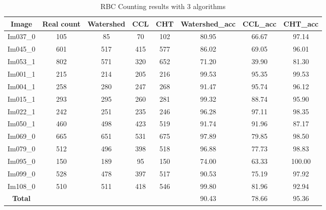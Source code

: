 \begin{table}[H]
\centering
\begin{tabular}{|  c | c | c | c | c | c | c | c |}
\hline
\textbf{Image} & \textbf{Real count} & \textbf{Watershed} & \textbf{CCL} & \textbf{CHT} & \textbf{Watershed\_acc} & \textbf{CCL\_acc} & \textbf{CHT\_acc} \\
\hline
Im037\_0 & 105 & 85 & 70 & 102 & 80.95 & 66.67 & 97.14 \\
Im045\_0 & 601 & 517 & 415 & 577 & 86.02 & 69.05 & 96.01 \\
Im053\_1 & 802 & 571 & 320 & 652 & 71.20 & 39.90 & 81.30 \\
Im001\_1 & 215 & 214 & 205 & 216 & 99.53 & 95.35 & 99.53 \\
Im004\_1 & 258 & 280 & 247 & 268 & 91.47 & 95.74 & 96.12 \\
Im015\_1 & 293 & 295 & 260 & 281 & 99.32 & 88.74 & 95.90 \\
Im022\_1 & 242 & 251 & 235 & 246 & 96.28 & 97.11 & 98.35 \\
Im050\_1 & 460 & 498 & 423 & 519 & 91.74 & 91.96 & 87.17 \\
Im069\_0 & 665 & 651 & 531 & 675 & 97.89 & 79.85 & 98.50 \\
Im079\_0 & 512 & 496 & 398 & 518 & 96.88 & 77.73 & 98.83 \\
Im095\_0 & 150 & 189 & 95 & 150 & 74.00 & 63.33 & 100.00 \\
Im099\_0 & 528 & 478 & 397 & 517 & 90.53 & 75.19 & 97.92 \\
Im108\_0 & 510 & 511 & 418 & 546 & 99.80 & 81.96 & 92.94 \\
\hline
\textbf{Total} &  &  &  &  & 90.43 & 78.66 & 95.36 \\
\hline
\end{tabular}
\caption{RBC Counting results with 3 algorithms}
\label{table:DOUNET-RBC}
\end{table}